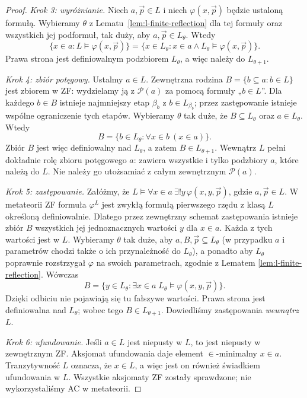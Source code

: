 \begin{proof}
\emph{Krok 3: wyróżnianie.}
Niech $a,\vec p\in L$ i niech $\varphi(x,\vec p)$
będzie ustaloną formułą. Wybieramy $\theta$ z
Lematu~\ref{lem:l-finite-reflection} dla tej formuły
oraz wszystkich jej podformuł, tak duży, aby
$a,\vec p\in L_\theta$. Wtedy
\[
\{x\in a:L\models\varphi(x,\vec p)\}
=\{x\in L_\theta:x\in a\land
L_\theta\models\varphi(x,\vec p)\}.
\]
Prawa strona jest definiowalnym podzbiorem $L_\theta$,
a więc należy do $L_{\theta+1}$.

\emph{Krok 4: zbiór potęgowy.}
Ustalmy $a\in L$. Zewnętrzna rodzina
$B=\{b\subseteq a:b\in L\}$ jest zbiorem w ZF:
wydzielamy ją z $\mathcal P(a)$ za pomocą formuły
„$b\in L$”. Dla każdego $b\in B$ istnieje najmniejszy
etap $\beta_b$ z $b\in L_{\beta_b}$; przez
zastępowanie istnieje wspólne ograniczenie tych
etapów. Wybieramy $\theta$ tak duże, że
$B\subseteq L_\theta$ oraz $a\in L_\theta$.
Wtedy
\[
B=\{b\in L_\theta:\forall x\in b\ (x\in a)\}.
\]
Zbiór $B$ jest więc definiowalny nad $L_\theta$,
a zatem $B\in L_{\theta+1}$. Wewnątrz $L$
pełni dokładnie rolę zbioru potęgowego $a$:
zawiera wszystkie i tylko podzbiory $a$, które
należą do $L$. Nie należy go utożsamiać z całym
zewnętrznym $\mathcal P(a)$.

\emph{Krok 5: zastępowanie.}
Załóżmy, że $L\models\forall x\in a\ \exists!y\,
\varphi(x,y,\vec p)$, gdzie $a,\vec p\in L$.
W metateorii ZF formuła $\varphi^L$ jest zwykłą
formułą pierwszego rzędu z klasą $L$ określoną
definiowalnie. Dlatego przez zewnętrzny schemat
zastępowania istnieje zbiór $B$ wszystkich jej
jednoznacznych wartości $y$ dla $x\in a$.
Każda z tych wartości jest w $L$. Wybieramy
$\theta$ tak duże, aby $a,B,\vec p\subseteq L_\theta$
(w przypadku $a$ i parametrów chodzi także o ich
przynależność do $L_\theta$), a ponadto aby
$L_\theta$ poprawnie rozstrzygał $\varphi$
na swoich parametrach, zgodnie z Lematem
\ref{lem:l-finite-reflection}. Wówczas
\[
B=\{y\in L_\theta:\exists x\in a\;
L_\theta\models\varphi(x,y,\vec p)\}.
\]
Dzięki odbiciu nie pojawiają się tu fałszywe wartości.
Prawa strona jest definiowalna nad $L_\theta$;
wobec tego $B\in L_{\theta+1}$. Dowiedliśmy
zastępowania \emph{wewnątrz $L$}.

\emph{Krok 6: ufundowanie.}
Jeśli $a\in L$ jest niepusty w $L$, to jest niepusty
w zewnętrznym ZF. Aksjomat ufundowania daje element
$\in$-minimalny $x\in a$. Tranzytywność $L$ oznacza,
że $x\in L$, a więc jest on również świadkiem
ufundowania w $L$. Wszystkie aksjomaty ZF zostały
sprawdzone; nie wykorzystaliśmy AC w metateorii.
\end{proof}


